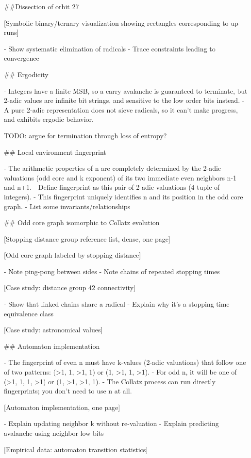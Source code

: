 \documentclass[12pt]{article}
\theoremstyle{plain}
\theoremstyle{definition}
\begin{document}
##Dissection of orbit 27

[Symbolic binary/ternary visualization showing rectangles corresponding to up-runs]

- Show systematic elimination of radicals
- Trace constraints leading to convergence

## Ergodicity

- Integers have a finite MSB, so a carry avalanche is guaranteed to terminate, but 2-adic values are infinite bit strings, and sensitive to the low order bits instead. 
- A pure 2-adic representation does not sieve radicals, so it can't make progress, and exhibits ergodic behavior.

TODO: argue for termination through loss of entropy?

## Local environment fingerprint

- The arithmetic properties of n are completely determined by the 2-adic valuations (odd core and k exponent) of its two immediate even neighbors n-1 and n+1.
- Define fingerprint as this pair of 2-adic valuations (4-tuple of integers).
- This fingerprint uniquely identifies n and its position in the odd core graph.
- List some invariants/relationships

## Odd core graph isomorphic to Collatz evolution

[Stopping distance group reference list, dense, one page]

[Odd core graph labeled by stopping distance]

- Note ping-pong between sides
- Note chains of repeated stopping times

[Case study: distance group 42 connectivity]

- Show that linked chains share a radical
- Explain why it's a stopping time equivalence class

[Case study: astronomical values]

## Automaton implementation

- The fingerprint of even n must have k-values (2-adic valuations) that follow one of two patterns: (>1, 1, >1, 1) or (1, >1, 1, >1).
- For odd n, it will be one of (>1, 1, 1, >1) or (1, >1, >1, 1).
- The Collatz process can run directly fingerprints; you don't need to use n at all.

[Automaton implementation, one page]

- Explain updating neighbor k without re-valuation
- Explain predicting avalanche using neighbor low bits

[Empirical data: automaton transition statistics]
\end{document}
